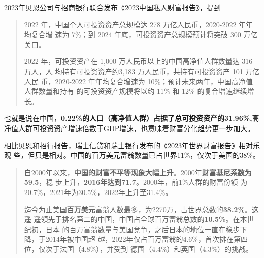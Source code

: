 2023年贝恩公司与招商银行联合发布《2023中国私人财富报告》，提到
\begin{quotation}
  2022 年，中国个人可投资资产总规模达 278 万亿人民币，2020-2022 年年均复合增
  速为 7\%；到 2024 年底，可投资资产总规模预计将突破 300 万亿关口。

  2022 年，可投资资产在 1,000 万人民币以上的中国高净值人群数量达 316 万人，人
  均持有可投资资产约3,183 万人民币，共持有可投资资产 101 万亿人民
  币，2020-2022 年年均复合增速为 10\%；预计未来两年，中国高净值人群数量和持有
  的可投资资产规模将以约 11\% 和 12\% 的复合增速继续增长。
\end{quotation}
也就是说在中国，\textbf{0.22\%的人口（高净值人群）占据了总可投资资产的31.96\%,}高
净值人群可投资资产增速倍数于GDP增速，也意味着财富分化趋势更一步加大。

相比贝恩和招行报告，瑞士信贷和瑞士银行发布的《2023年世界财富报告》相对乐观
些，但只是相对。中国的百万美元富翁数量已占世界11\%，仅次于美国的38\%。
\begin{quotation}
  自2000年以来，\textbf{中国的财富不平等现象大幅上升}。2000年\textbf{财富基尼系数为59.5}，稳
  步上升，\textbf{2016年达到71.7}。2000年，前1\%人群的财富份额
  为20.7\%，2021年为30.5\%，2022年上升至31.4\%。

  迄今为止美国\textbf{百万美元}富翁人数最多，为2270万，占世界总数的\textbf{38.2\%}。这遥
  遥领先于排名第二的中国，中国占全球百万富翁总数的\textbf{10.5\%}。在本世纪初，日本
  的百万富翁数量与美国竞争，之后日本的地位一直在稳步下降，于2014年被中国超
  越，2022年仅占百万富翁的4.6\%，首次排在第四位，仅次于法国（4.8\%），并受到
  德国（4.4\%）和英国（4.3\%）的挑战。
\end{quotation}

